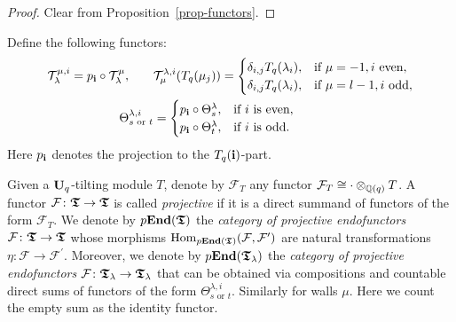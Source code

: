 \begin{proof}
Clear from Proposition~\ref{prop-functors}.
\end{proof}

Define the following functors:
\begin{gather*}
\begin{aligned}
\mathcal T^{\mu,i}_{\lambda}=p_{\boldsymbol{\mathrm{i}}}\circ\mathcal T^{\mu}_{\lambda},
\quad\quad&
\mathcal T_{\mu}^{\lambda,i}(T_q({\mu_j}))=\begin{cases}
\delta_{i,j}T_q({\lambda_{i}}),&\text{if }\mu=-1, i\text{ even},\\
\delta_{i,j}T_q({\lambda_{i}}),&\text{if }\mu=l-1, i\text{ odd},
\end{cases}
\\
\Theta_{s\text{ or }t}^{\lambda,i}&=\begin{cases}p_{\boldsymbol{\mathrm{i}}}\circ\Theta^{\lambda}_{s}, &\text{if }i\text{ is even},\\
p_{\boldsymbol{\mathrm{i}}}\circ\Theta^{\lambda}_{t}, &\text{if }i\text{ is odd}.
\end{cases}
\end{aligned}
\end{gather*}
Here $p_{\boldsymbol{\mathrm{i}}}$ denotes the projection to the $T_q({\boldsymbol{\mathrm{i}}})$-part.

\begin{defn}\label{defn-tiltcatendo}
Given a $\boldsymbol{\mathrm{U}}_q$-tilting module $T$, denote by 
$\mathcal F_{T}$ any functor $\mathcal F_{T}\cong \cdot\otimes_{\mathbb{Q}(q)}T$.
A functor $\mathcal F\colon\boldsymbol{\mathfrak{T}}\to\boldsymbol{\mathfrak{T}}$ is called 
\textit{projective} if it is a direct summand 
of functors of the form $\mathcal F_{T}$.
We denote by $p\boldsymbol{\mathrm{End}}(\boldsymbol{\mathfrak{T}})$ the \textit{category 
of projective endofunctors} $\mathcal F\colon\boldsymbol{\mathfrak{T}}\to\boldsymbol{\mathfrak{T}}$ 
whose morphisms $\mathrm{Hom}_{p\boldsymbol{\mathrm{End}}(\boldsymbol{\mathfrak{T}})}(\mathcal F,\mathcal F^{\prime})$ 
are natural transformations $\eta\colon\mathcal F\to\mathcal F^{\prime}$. 
Moreover, we denote by $p\boldsymbol{\mathrm{End}}(\boldsymbol{\mathfrak{T}}_{\lambda})$ the \textit{category 
of projective endofunctors} $\mathcal F\colon\boldsymbol{\mathfrak{T}}_{\lambda}\to\boldsymbol{\mathfrak{T}}_{\lambda}$ 
that can be obtained via compositions and countable direct sums 
of functors of the form $\Theta_{s\text{ or }t}^{\lambda,i}$. Similarly for walls $\mu$. 
Here we count the empty sum as the identity functor. 
\end{defn}


